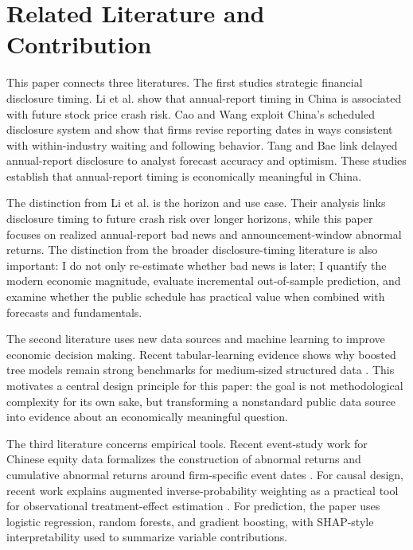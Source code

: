 \documentclass[10pt]{article}
\begin{document}
\section{Related Literature and Contribution}

This paper connects three literatures. The first studies strategic financial disclosure timing. Li et al. \cite{Li2020} show that annual-report timing in China is associated with future stock price crash risk. Cao and Wang \cite{Cao2021} exploit China's scheduled disclosure system and show that firms revise reporting dates in ways consistent with within-industry waiting and following behavior. Tang and Bae \cite{TangBae2021} link delayed annual-report disclosure to analyst forecast accuracy and optimism. These studies establish that annual-report timing is economically meaningful in China.

The distinction from Li et al. \cite{Li2020} is the horizon and use case. Their analysis links disclosure timing to future crash risk over longer horizons, while this paper focuses on realized annual-report bad news and announcement-window abnormal returns. The distinction from the broader disclosure-timing literature is also important: I do not only re-estimate whether bad news is later; I quantify the modern economic magnitude, evaluate incremental out-of-sample prediction, and examine whether the public schedule has practical value when combined with forecasts and fundamentals.

The second literature uses new data sources and machine learning to improve economic decision making. Recent tabular-learning evidence shows why boosted tree models remain strong benchmarks for medium-sized structured data \cite{Grinsztajn2022}. This motivates a central design principle for this paper: the goal is not methodological complexity for its own sake, but transforming a nonstandard public data source into evidence about an economically meaningful question.

The third literature concerns empirical tools. Recent event-study work for Chinese equity data formalizes the construction of abnormal returns and cumulative abnormal returns around firm-specific event dates \cite{LiFangCao2024}. For causal design, recent work explains augmented inverse-probability weighting as a practical tool for observational treatment-effect estimation \cite{Kurz2022}. For prediction, the paper uses logistic regression, random forests, and gradient boosting, with SHAP-style interpretability used to summarize variable contributions.
\end{document}
